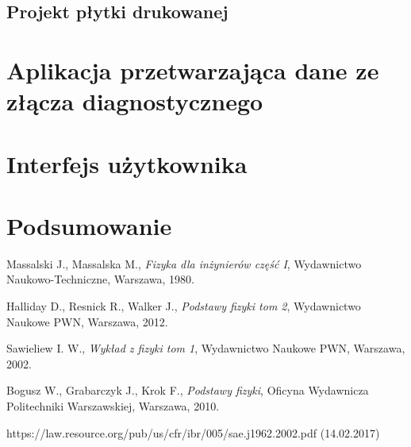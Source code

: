 \documentclass[12pt]{article} %
\numberwithin{equation}{subsection}
\numberwithin{figure}{section}
\numberwithin{table}{section}
\begin{document}
		\newpage
	
	\subsection{Projekt płytki drukowanej}
		\hspace{0.5cm}
	
		\newpage
	
\section{Aplikacja przetwarzająca dane ze złącza diagnostycznego}
	\hspace{0.5cm}
	
	\newpage
	
	
\section{Interfejs użytkownika}
	\hspace{0.5cm}
	
	\newpage
	
\section{Podsumowanie}
	
	\hspace{0.5cm} 
	
	\newpage	
	
\begin{thebibliography}{99}

		Massalski J., Massalska M., \emph{Fizyka dla inżynierów część I}, Wydawnictwo Naukowo-Techniczne, Warszawa, 1980.
	
		Halliday D., Resnick R., Walker J., \emph{Podstawy fizyki tom 2}, Wydawnictwo Naukowe PWN, Warszawa, 2012.

		Sawieliew I. W., \emph{Wykład z fizyki tom 1}, Wydawnictwo Naukowe PWN, Warszawa, 2002.
	
		Bogusz W., Grabarczyk J., Krok F., \emph{Podstawy fizyki}, Oficyna Wydawnicza Politechniki Warszawskiej, Warszawa, 2010.
		
		https://law.resource.org/pub/us/cfr/ibr/005/sae.j1962.2002.pdf (14.02.2017)
		

\end{thebibliography}
	\newpage

	\listoffigures{}
	\newpage

	\listoftables
	\newpage
\end{document}
